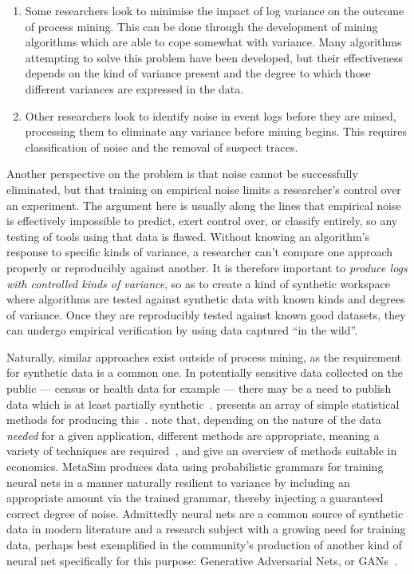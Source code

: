 \begin{enumerate}
    \item Some researchers look to minimise the impact of log variance on the
    outcome of process mining. This can be done through the development of
    mining algorithms which are able to cope somewhat with variance. Many
    algorithms attempting to solve this problem have been developed, but their
    effectiveness depends on the kind of variance present and the degree to
    which those different variances are expressed in the
    data\cite{Mitsyuk_2016}.
    \item Other researchers look to identify noise in event logs before they are
    mined, processing them to eliminate any variance before mining begins. This
    requires classification of noise and the removal of suspect
    traces\cite{Cheng2015logsanitization}.
\end{enumerate}

Another perspective on the problem is that noise cannot be successfully
eliminated, but that training on empirical noise limits a researcher's control
over an experiment. The argument here is usually along the lines that empirical
noise is effectively impossible to predict, exert control over, or classify
entirely, so any testing of tools using that data is flawed. Without knowing an
algorithm's response to specific kinds of variance, a researcher can't compare
one approach properly or reproducibly against another. It is therefore important
to \emph{produce logs with controlled kinds of variance}, so as to create a kind
of synthetic workspace where algorithms are tested against synthetic data with
known kinds and degrees of variance. Once they are reproducibly tested against
known good datasets, they can undergo empirical verification by using data
captured ``in the wild''.

Naturally, similar approaches exist outside of process mining, as the
requirement for synthetic data is a common one. In potentially sensitive data
collected on the public --- census or health data for example --- there may be a
need to publish data which is at least partially
synthetic~\cite{little1993statistical,Drechsler_2011,rubin1993discussion}.
\citeauthor{Drechsler_2011} presents an array of simple statistical methods for
producing this~\cite{Drechsler_2011}. \citeauthor{koenecke2020syntheticgenecon}
note that, depending on the nature of the data \emph{needed} for a given
application, different methods are appropriate, meaning a variety of techniques
are required~\cite{koenecke2020syntheticgenecon}, and give an overview of
methods suitable in economics. MetaSim\cite{kar2019metasim} produces data using
probabilistic grammars for training neural nets in a manner naturally resilient
to variance by including an appropriate amount via the trained grammar, thereby
injecting a guaranteed correct degree of noise. Admittedly neural nets are a
common source of synthetic data in modern literature and a research subject with
a growing need for training data, perhaps best exemplified in the community's
production of another kind of neural net specifically for this purpose:
Generative Adversarial Nets, or GANs~\cite{goodfellow2014generative}.

